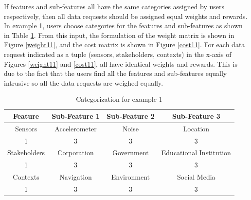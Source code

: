 If features and sub-features all have the same categories assigned by users respectively, then all data requests should be assigned equal weights and rewards. In example 1, users choose categories for the features and sub-features as shown in Table \ref{tab:scenario11}. From this input, the formulation of the weight matrix is shown in Figure \ref{weight11}, and the cost matrix is shown in Figure \ref{cost11}.
For each data request indicated as a tuple (sensors, stakeholders, contexts) in the x-axis of Figures \ref{weight11} and \ref{cost11}, all have identical weights and rewards. This is due to the fact that the users find all the features and sub-features equally intrusive so all the data requests are weighed equally.

\begin{table}[h!]
  \centering
  \caption{Categorization for example 1}
  \label{tab:scenario11}
  \begin{tabular}{cccc}
    \toprule
    Feature & Sub-Feature 1 & Sub-Feature 2 & Sub-Feature 3\\
    \midrule
    Sensors & Accelerometer & Noise & Location\\
     1 & 3 & 3 & 3\\ \hhline{====}
     Stakeholders & Corporation & Government & Educational Institution\\
     1 & 3 & 3 & 3\\ \hhline{====}
     Contexts & Navigation & Environment & Social Media\\
     1 & 3 & 3 & 3\\ 
    \bottomrule
  \end{tabular}
\end{table}
 
